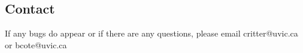 \subsection{Contact}
If any bugs do appear or if there are any questions, please email critter@uvic.ca or bcote@uvic.ca
\begin{verbatim}

\end{verbatim}


%
%
%
%



